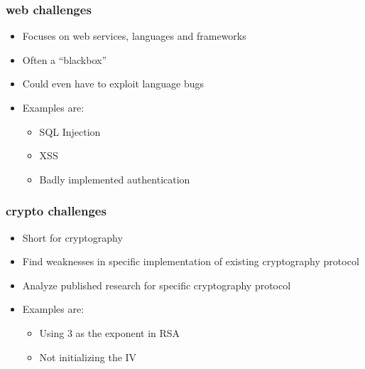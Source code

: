 \documentclass[aspectratio=169]{beamer}
\begin{document}
\begin{frame}
    \frametitle{web challenges}
    \begin{itemize}
        \item Focuses on web services, languages and frameworks
        \item Often a ``blackbox''
        \item Could even have to exploit language bugs
        \item Examples are:
        \begin{itemize}
            \item SQL Injection
            \item XSS
            \item Badly implemented authentication
        \end{itemize}
    \end{itemize}
\end{frame}

\begin{frame}
    \frametitle{crypto challenges}
    \begin{itemize}
        \item Short for cryptography
        \item Find weaknesses in specific implementation of existing cryptography protocol
        \item Analyze published research for specific cryptography protocol
        \item Examples are:
        \begin{itemize}
            \item Using $3$ as the exponent in RSA
            \item Not initializing the IV
        \end{itemize}
    \end{itemize}
\end{frame}
\end{document}
